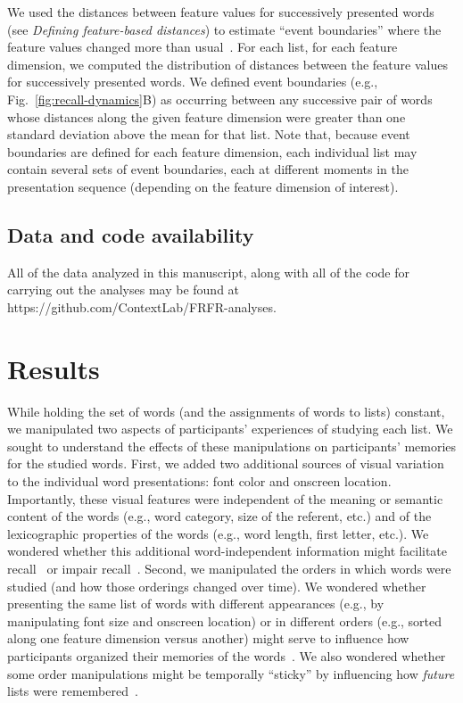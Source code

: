 \documentclass[11pt]{article}
\begin{document}
We used the distances between feature values for successively presented words
(see \textit{Defining feature-based distances}) to estimate ``event
boundaries'' where the feature values changed more than
usual~\citep{EzzyDava11, MannEtal16,RadvCope06, SwalEtal09, SwalEtal11,
DuBrDava16}. For each list, for each feature dimension, we computed the
distribution of distances between the feature values for successively presented
words. We defined event boundaries (e.g., Fig.~\ref{fig:recall-dynamics}B) as
occurring between any successive pair of words whose distances along the given
feature dimension were greater than one standard deviation above the mean for
that list. Note that, because event boundaries are defined for each feature
dimension, each individual list may contain several sets of event boundaries,
each at different moments in the presentation sequence (depending on the
feature dimension of interest).

\subsection*{Data and code availability}

All of the data analyzed in this manuscript, along with all of the code for
carrying out the analyses may be found at https://github.com/ContextLab/FRFR-analyses.

\section*{Results}

While holding the set of words (and the assignments of words to lists)
constant, we manipulated two aspects of participants' experiences of studying
each list. We sought to understand the effects of these manipulations on
participants' memories for the studied words. First, we added two additional
sources of visual variation to the individual word presentations: font color
and onscreen location. Importantly, these visual features were independent of
the meaning or semantic content of the words (e.g., word category, size of the
referent, etc.) and of the lexicographic properties of the words (e.g., word
length, first letter, etc.). We wondered whether this additional
word-independent information might facilitate recall~\citep[e.g., by providing
new or richer potential ways of organizing or retrieving memories of the
studied words;][]{HargEtal12, Mada21, MeinEtal20, DavaEtal03, SlamBarl79,
DrewMurd80, SochEtal09} or impair recall~\citep[e.g., by distracting or
confusing participants with irrelevant information][]{MarsEtal15, MarsEtal12,
Lang05, ReinEtal92}. Second, we manipulated the orders in which words were
studied (and how those orderings changed over time). We wondered whether
presenting the same list of words with different appearances (e.g., by
manipulating font size and onscreen location) or in different orders (e.g.,
sorted along one feature dimension versus another) might serve to influence how
participants organized their memories of the words~\citep[e.g., ][]{PolyKaha08,
MannEtal15}. We also wondered whether some order manipulations might be
temporally ``sticky'' by influencing how \textit{future} lists were
remembered~\citep[e.g., ][]{SiroEtal05, LohnEtal10, Whit27, Badd68,
DarlMurd71}.
\end{document}
